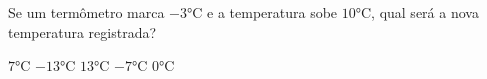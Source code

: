 Se um termômetro marca $-3$°C e a temperatura sobe $10$°C, qual será a nova temperatura registrada?

$7$°C
$-13$°C
$13$°C
$-7$°C
$0$°C




